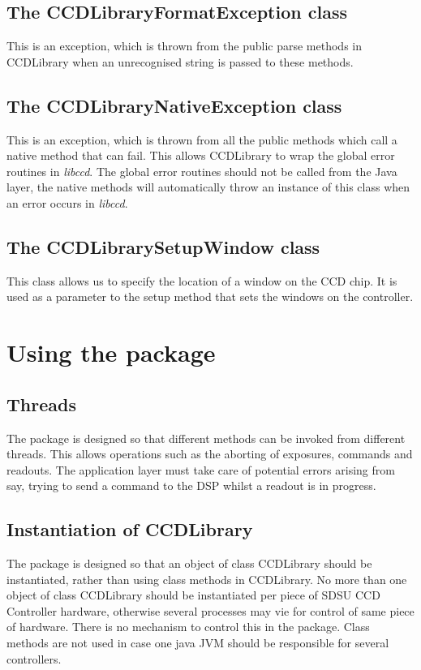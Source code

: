 \documentclass[10pt,a4paper]{article}
\begin{document}
\subsection{The CCDLibraryFormatException class}
This is an exception, which is thrown from the public parse methods in CCDLibrary when an unrecognised
string is passed to these methods.

\subsection{The CCDLibraryNativeException class}
This is an exception, which is thrown from all the public methods which call a native method that can fail.
This allows CCDLibrary to wrap the global error routines in {\em libccd}. The global error routines should not
be called from the Java layer, the native methods will automatically throw an instance of this class
when an error occurs in {\em libccd}.

\subsection{The CCDLibrarySetupWindow class}
This class allows us to specify the location of a window on the CCD chip. 
It is used as a parameter to the setup method that sets the windows on the controller. 

\section{Using the package}
\subsection{Threads}
The package is designed so that different methods can be invoked from different threads. This allows
operations such as the aborting of exposures, commands and readouts. The application layer must take care of
potential errors arising from say, trying to send a command to the DSP whilst a readout is in progress.

\subsection{Instantiation of CCDLibrary}
The package is designed so that an object of class CCDLibrary should be instantiated, rather than using class
methods in CCDLibrary. No more than one object of class CCDLibrary should be instantiated per piece of 
SDSU CCD Controller hardware, otherwise several processes may vie for control of same piece of hardware.
There is no mechanism to control this in the package. Class methods are not used in case one java JVM
should be responsible for several controllers.
\end{document}
